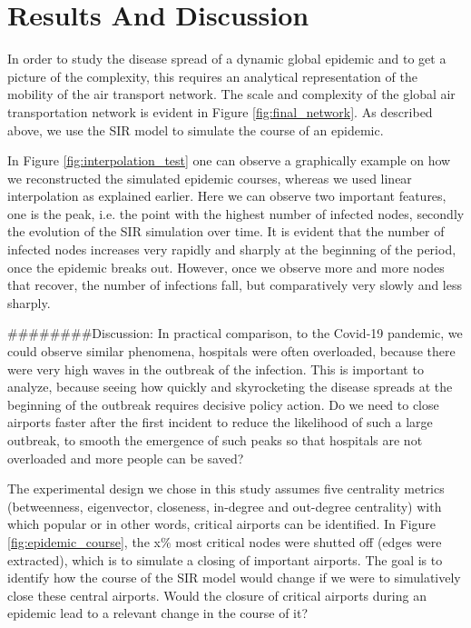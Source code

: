 \documentclass{Resources/netsci-project}
\begin{document}

\section{Results And Discussion}
In order to study the disease spread of a dynamic global epidemic and to get a picture of the complexity, this requires an analytical representation of the mobility of the air transport network. The scale and complexity of the global air transportation network is evident in Figure \ref{fig:final_network}. As described above, we use the SIR model to simulate the course of an epidemic.

In Figure \ref{fig:interpolation_test} one can observe a graphically example on how we reconstructed the simulated epidemic courses, whereas we used linear interpolation as explained earlier. Here we can observe two important features, one is the peak, i.e. the point with the highest number of infected nodes, secondly the evolution of the SIR simulation over time.
It is evident that the number of infected nodes increases very rapidly and sharply at the beginning of the period, once the epidemic breaks out. However, once we observe more and more nodes that recover, the number of infections fall, but comparatively very slowly and less sharply. 

########Discussion:
In practical comparison, to the Covid-19 pandemic, we could observe similar phenomena, hospitals were often overloaded, because there were very high waves in the outbreak of the infection. This is important to analyze, because seeing how quickly and skyrocketing the disease spreads at the beginning of the outbreak requires decisive policy action. Do we need to close airports faster after the first incident to reduce the likelihood of such a large outbreak, to smooth the emergence of such peaks so that hospitals are not overloaded and more people can be saved?

The experimental design we chose in this study assumes five centrality metrics (betweenness, eigenvector, closeness, in-degree and out-degree centrality) with which popular or in other words, critical airports can be identified. 
In Figure \ref{fig:epidemic_course}, the x\% most critical nodes were shutted off (edges were extracted), which is to simulate a closing of important airports. The goal is to identify how the course of the SIR model would change if we were to simulatively close these central airports. Would the closure of critical airports during an epidemic lead to a relevant change in the course of it?
\end{document}
